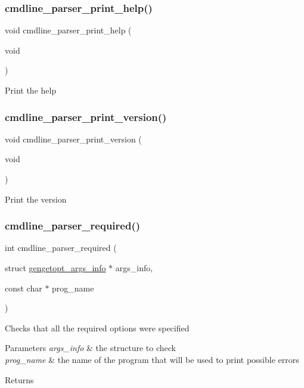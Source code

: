 \subsubsection{\texorpdfstring{cmdline\+\_\+parser\+\_\+print\+\_\+help()}{cmdline\_parser\_print\_help()}}
{\footnotesize\ttfamily void cmdline\+\_\+parser\+\_\+print\+\_\+help (\begin{DoxyParamCaption}\item[{void}]{ }\end{DoxyParamCaption})}

Print the help \mbox{\label{des-getopt_8h_a96f27bf35ce0ab8eea7a1f6e6b59a5e2}} 
\subsubsection{\texorpdfstring{cmdline\+\_\+parser\+\_\+print\+\_\+version()}{cmdline\_parser\_print\_version()}}
{\footnotesize\ttfamily void cmdline\+\_\+parser\+\_\+print\+\_\+version (\begin{DoxyParamCaption}\item[{void}]{ }\end{DoxyParamCaption})}

Print the version \mbox{\label{des-getopt_8h_a83651e5be280d60aed58fdb72456a030}} 
\subsubsection{\texorpdfstring{cmdline\+\_\+parser\+\_\+required()}{cmdline\_parser\_required()}}
{\footnotesize\ttfamily int cmdline\+\_\+parser\+\_\+required (\begin{DoxyParamCaption}\item[{struct \hyperlink{structgengetopt__args__info}{gengetopt\+\_\+args\+\_\+info} $\ast$}]{args\+\_\+info,  }\item[{const char $\ast$}]{prog\+\_\+name }\end{DoxyParamCaption})}

Checks that all the required options were specified 
\begin{DoxyParams}{Parameters}
{\em args\+\_\+info} & the structure to check \\
\hline
{\em prog\+\_\+name} & the name of the program that will be used to print possible errors \\
\hline
\end{DoxyParams}
\begin{DoxyReturn}{Returns}

\end{DoxyReturn}
